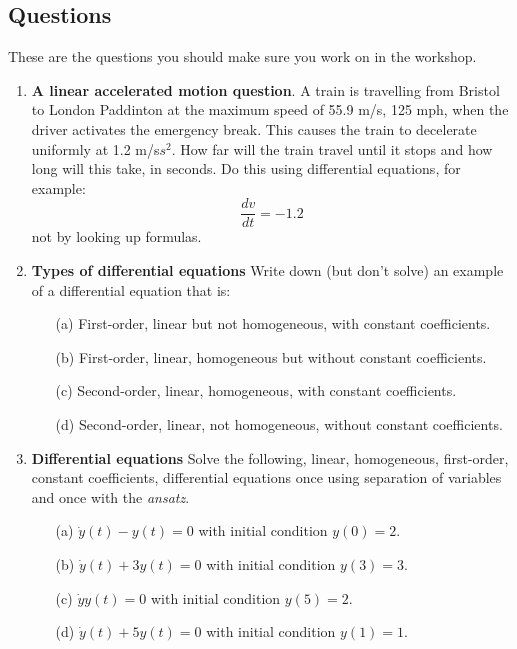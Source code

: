 \documentclass[11pt,a4paper]{scrartcl}
\begin{document}
\subsection*{Questions}

These are the questions you should make sure you work on in the workshop.

\begin{enumerate}

\item \textbf{A linear accelerated motion question}. A train is travelling from Bristol to London Paddinton at the maximum speed of 55.9 m/s, 125 mph, when the driver activates the emergency break. This causes the train to decelerate uniformly at 1.2 m/s$s^2$. How far will the train travel until it stops and how long will this take, in seconds. Do this using differential equations, for example:
  \begin{equation}
    \frac{dv}{dt}=-1.2
  \end{equation}
  not by looking up formulas.

\item \textbf{Types of differential equations}
  Write down (but don't solve) an example of a differential equation that is:
  \begin{itemize}
  \item[(a)] First-order, linear but not homogeneous, with constant coefficients.
  \item[(b)] First-order, linear, homogeneous but without constant coefficients.
  \item[(c)] Second-order, linear, homogeneous, with constant coefficients.
  \item[(d)] Second-order, linear, not homogeneous, without constant coefficients.
  \end{itemize}
	
\item \textbf{Differential equations} Solve the following, linear,
  homogeneous, first-order, constant coefficients, differential
  equations once using separation of variables and once with the
  \emph{ansatz}.
	\begin{itemize}
		\item[(a)] $\dot{y}(t) - y(t) = 0$ with initial condition $y(0) = 2$.
		\item[(b)] $\dot{y}(t) + 3y(t) = 0$ with initial condition $y(3) = 3$.
		\item[(c)] $\dot{y}y(t) = 0$ with  initial condition $y(5) = 2$.
		\item[(d)] $\dot{y}(t) + 5y(t) = 0$ with initial condition
                  $y(1) = 1$.
	\end{itemize}

\end{enumerate}
        
\end{document}

